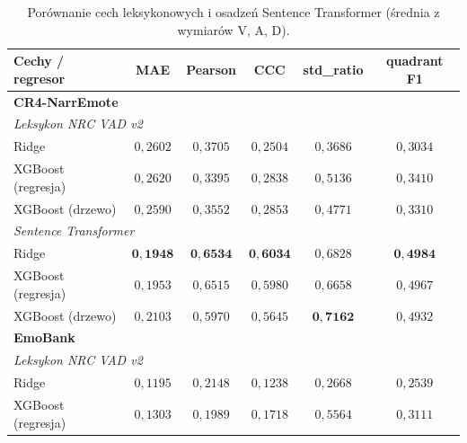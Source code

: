 \begin{table}[htbp]
    \centering
    \small
    \caption{Porównanie cech leksykonowych i osadzeń Sentence Transformer (średnia z wymiarów V, A, D).}
    \begin{tabular}{l c c c c c}
        \toprule
        \textbf{Cechy / regresor} & \textbf{MAE} & \textbf{Pearson} & \textbf{CCC} & \textbf{std\_ratio} & \textbf{quadrant F1} \\
        \midrule
        \multicolumn{6}{l}{\textbf{CR4-NarrEmote}} \\
        \multicolumn{6}{l}{\hspace{1em}\textit{Leksykon NRC VAD v2}} \\
        \hspace{2em}Ridge              & $0{,}2602$ & $0{,}3705$ & $0{,}2504$ & $0{,}3686$ & $0{,}3034$ \\
        \hspace{2em}XGBoost (regresja) & $0{,}2620$ & $0{,}3395$ & $0{,}2838$ & $0{,}5136$ & $0{,}3410$ \\
        \hspace{2em}XGBoost (drzewo)   & $0{,}2590$ & $0{,}3552$ & $0{,}2853$ & $0{,}4771$ & $0{,}3310$ \\
        \multicolumn{6}{l}{\hspace{1em}\textit{Sentence Transformer}} \\
        \hspace{2em}Ridge              & $\mathbf{0{,}1948}$ & $\mathbf{0{,}6534}$ & $\mathbf{0{,}6034}$ & $0{,}6828$ & $\mathbf{0{,}4984}$ \\
        \hspace{2em}XGBoost (regresja) & $0{,}1953$ & $0{,}6515$ & $0{,}5980$ & $0{,}6658$ & $0{,}4967$ \\
        \hspace{2em}XGBoost (drzewo)   & $0{,}2103$ & $0{,}5970$ & $0{,}5645$ & $\mathbf{0{,}7162}$ & $0{,}4932$ \\
        \midrule
        \multicolumn{6}{l}{\textbf{EmoBank}} \\
        \multicolumn{6}{l}{\hspace{1em}\textit{Leksykon NRC VAD v2}} \\
        \hspace{2em}Ridge              & $0{,}1195$ & $0{,}2148$ & $0{,}1238$ & $0{,}2668$ & $0{,}2539$ \\
        \hspace{2em}XGBoost (regresja) & $0{,}1303$ & $0{,}1989$ & $0{,}1718$ & $0{,}5564$ & $0{,}3111$ \\

\end{tabular}
\end{table}
